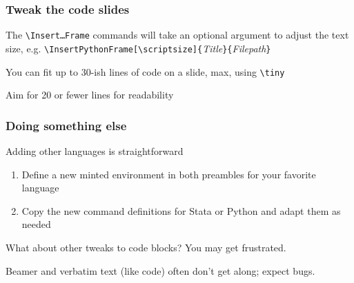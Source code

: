 \documentclass[aspectratio=169,handout]{beamer}
\begin{document}
\begin{frame}
	\frametitle{Tweak the code slides}
	\begin{witem}
		\item The \texttt{\textbackslash{}Insert\dots{}Frame} commands will take an optional 
			argument to adjust the text size, e.g.
			\texttt{\textbackslash{}InsertPythonFrame[\textbackslash{}scriptsize]\{}\textit{Title}\texttt{\}\{}\textit{Filepath}\texttt{\}}
		\item You can fit up to 30-ish lines of code on a slide, max, using \texttt{\textbackslash{}tiny} 
		\item Aim for 20 or fewer lines for readability
	\end{witem}
\end{frame}

\begin{frame}
	\frametitle{Doing something else}
	\begin{witem}
		\item Adding other languages is straightforward
			\begin{enumerate}
				\item Define a new minted environment
					in both preambles for your favorite language
					\href{https://pygments.org/languages/}{}
				\item Copy the new command definitions for Stata or Python and adapt them as needed
			\end{enumerate}
		\item What about other tweaks to code blocks? You may get frustrated.
		\item Beamer and verbatim text (like code) often don't get along; expect bugs.
	\end{witem}
\end{frame}




\end{document}
